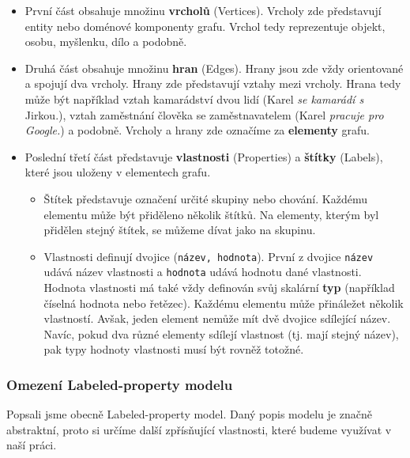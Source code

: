 \begin{itemize}
\item První část obsahuje množinu \textbf{vrcholů} (Vertices).
Vrcholy zde představují entity nebo doménové komponenty grafu.
Vrchol tedy reprezentuje objekt, osobu, myšlenku, dílo a podobně.

\item Druhá část obsahuje množinu \textbf{hran} (Edges).
Hrany jsou zde vždy orientované a spojují dva vrcholy.
Hrany zde představují vztahy mezi vrcholy.
Hrana tedy může být například vztah kamarádství dvou lidí (Karel \textit{se kamarádí s} Jirkou.), vztah zaměstnání člověka se zaměstnavatelem (Karel \textit{pracuje pro Google.}) a podobně.
Vrcholy a hrany zde označíme za \textbf{elementy} grafu.
\item Poslední třetí část představuje \textbf{vlastnosti} (Properties) a \textbf{štítky} (Labels), které jsou uloženy v elementech grafu.

\begin{itemize}
\item
Štítek představuje označení určité skupiny nebo chování.
Každému elementu může být přiděleno několik štítků.
Na elementy, kterým byl přidělen stejný štítek, se můžeme dívat jako na skupinu.

\item
Vlastnosti definují dvojice (\texttt{název, hodnota}).
První z dvojice \texttt{název} udává název vlastnosti a \texttt{hodnota} udává hodnotu dané vlastnosti.
Hodnota vlastnosti má také vždy definován svůj skalární \textbf{typ} (například číselná hodnota nebo řetězec).
Každému elementu může přináležet několik vlastností.
Avšak, jeden element nemůže mít dvě dvojice sdílející název.
Navíc, pokud dva různé elementy sdílejí vlastnost (tj. mají stejný název), pak typy hodnoty vlastnosti musí být rovněž totožné.
\end{itemize}
\end{itemize}

\subsubsection{Omezení Labeled-property modelu}
Popsali jsme obecně Labeled-property model.
Daný popis modelu je značně abstraktní, proto si určíme další zpřísňující vlastnosti, které budeme využívat v naší práci.

